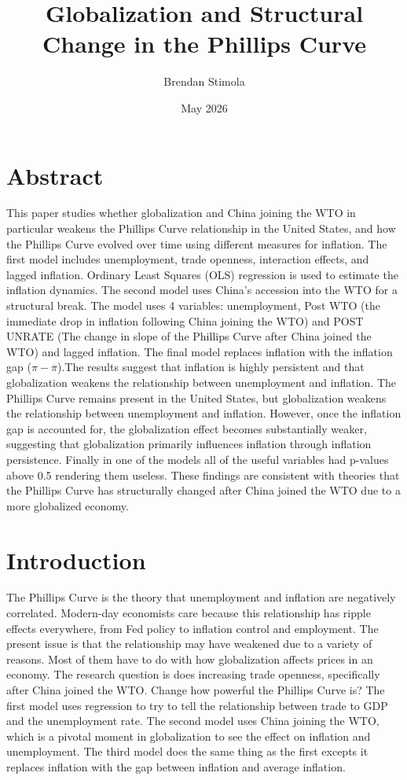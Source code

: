 \documentclass{article}
\title{Globalization and Structural Change in the Phillips Curve}
\author{Brendan Stimola}
\date{May 2026}
\begin{document}
\maketitle

\section{Abstract}

This paper studies whether globalization and China joining the WTO in particular weakens the Phillips Curve relationship in the United States, and how the Phillips Curve evolved over time using different measures for inflation. The first model includes unemployment, trade openness, interaction effects, and lagged inflation. Ordinary Least Squares (OLS) regression is used to estimate the inflation dynamics. The second model uses China's accession into the WTO for a structural break. The model uses 4 variables: unemployment, Post WTO (the immediate drop in inflation following China joining the WTO) and POST UNRATE (The change in slope of the Phillips Curve after China joined the WTO) and lagged inflation. The final model replaces inflation with the inflation gap ($\pi-\overline{\pi}$).The results suggest that inflation is highly persistent and that globalization weakens the relationship between unemployment and inflation. The Phillips Curve remains present in the United States, but globalization weakens the relationship between unemployment and inflation. However, once the inflation gap is accounted for, the globalization effect becomes substantially weaker, suggesting that globalization primarily influences inflation through inflation persistence. Finally in one of the models all of the useful variables had p-values above 0.5 rendering them useless. These findings are consistent with theories that the Phillips Curve has structurally changed after China joined the WTO due to a more globalized economy. 

\section{Introduction}

The Phillips Curve is the theory that unemployment and inflation are negatively correlated. Modern-day economists care because this relationship has ripple effects everywhere, from Fed policy to inflation control and employment. The present issue is that the relationship may have weakened due to a variety of reasons. Most of them have to do with how globalization affects prices in an economy. The research question is does increasing trade openness, specifically after China joined the WTO. Change how powerful the Phillips Curve is? The first model uses regression to try to tell the relationship between trade to GDP and the unemployment rate. The second model uses China joining the WTO, which is a pivotal moment in globalization to see the effect on inflation and unemployment. The third model does the same thing as the first excepts it replaces inflation with the gap between inflation and average inflation.
\end{document}
